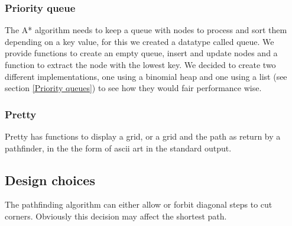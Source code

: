 \documentclass[12pt, a4paper]{article}
\begin{document}
\subsubsection{Priority queue}
The A* algorithm needs to keep a queue with nodes to process and sort them depending on a key value, for this we created a datatype called queue. We provide functions to create an empty queue, insert and update nodes and a function to extract the node with the lowest key. We decided to create two different implementations, one using a binomial heap and one using a list (see section \ref{Priority queues}) to see how they would fair performance wise. 

\subsubsection{Pretty}
Pretty has functions to display a grid, or a grid and the path as return by a pathfinder, in the the form of ascii art in the standard output.






\subsection{Design choices}







The pathfinding algorithm can either allow or forbit diagonal steps to cut
corners. Obviously this decision may affect the shortest path. \cite{astar2}
\end{document}
